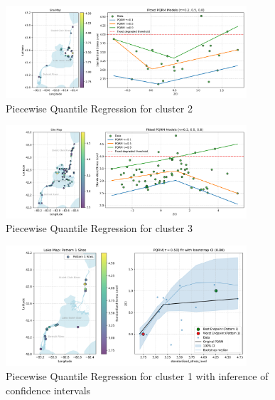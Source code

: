\begin{figure}[!h]
    \centering
    \includegraphics[width=0.8\textwidth]{../results/preliminary_results/pqrm_quantile_regression_pattern_2.png}
    \caption{Piecewise Quantile Regression for cluster 2}
    \label{fig:pqrm_quantile_regression_pattern_2}
\end{figure}

\begin{figure}[!h]
    \centering
    \includegraphics[width=0.8\textwidth]{../results/preliminary_results/pqrm_quantile_regression_pattern_3.png}
    \caption{Piecewise Quantile Regression for cluster 3}
    \label{fig:pqrm_quantile_regression_pattern_3}
\end{figure}

\begin{figure}[!h]
    \centering
    \includegraphics[width=0.8\textwidth]{../results/preliminary_results/pqrm_pattern_1_tau_0.5.png}
    \caption{Piecewise Quantile Regression for cluster 1 with inference of confidence intervals}
    \label{fig:pqrm_pattern_1_tau_0.5}
\end{figure}

